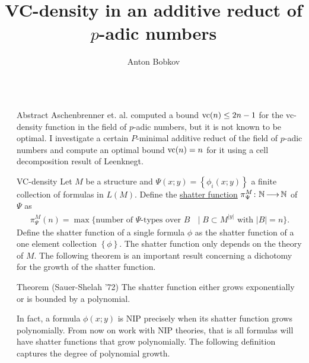\documentclass[final]{beamer}
\title{VC-density in an additive reduct of $p$-adic numbers}
\author{Anton Bobkov}
\institute{UCLA}
\newcommand{\curly}[1]{\left\{ #1 \right\}}
\newcommand{\defn}{\underline}
\newlength{\sepwid}
\newlength{\onecolwid}
\begin{document}

\setlength{\belowcaptionskip}{2ex} %
\setlength{\belowdisplayshortskip}{2ex} %

\begin{frame}[t] %

\begin{columns}[t] %

\begin{column}{\sepwid}\end{column} %

\begin{column}{\onecolwid} %

    \begin{block}{Abstract}
            Aschenbrenner et. al. computed a bound $\operatorname{vc}(n) \leq 2n - 1$ for the vc-density function in the field of $p$-adic numbers,
            but it is not known to be optimal.
            I investigate a certain $P$-minimal additive reduct of the field of $p$-adic numbers and
            compute an optimal bound $\operatorname{vc}(n) = n$ for it using a cell decomposition result of Leenknegt.
    \end{block}
    \begin{block}{VC-density}
	Let $M$ be a structure and $\Psi(x; y) = \curly{\phi_i(x; y)}$ a finite collection of formulas in $L(M)$.
        Define the \defn{shatter function} $\pi^M_\Psi \colon \mathbb{N} \operatorname{\longrightarrow} \mathbb{N}$ of $\Psi$ as
        \begin{align*}
            \pi^M_\Psi(n) = \max \{ \text {number of $\Psi$-types over $B$ }
            \mid B \subset M^{|y|} \text{ with } |B| = n\}.
        \end{align*}
        Define the shatter function of a single formula $\phi$ as the shatter function of a one element collection $\curly{\phi}$.
        The shatter function only depends on the theory of $M$.
        The following theorem is an important result concerning a dichotomy for the growth of the shatter function.
        \begin{alertblock}{Theorem (Sauer-Shelah '72)}
            The shatter function either grows exponentially or is bounded by a polynomial.
        \end{alertblock}
        In fact, a formula $\phi(x; y)$ is NIP precisely when its shatter function grows polynomially.
        From now on work with NIP theories, that is all formulas will have shatter functions that grow polynomially.
        The following definition captures the degree of polynomial growth.


\end{block}
\end{column}
\end{columns}
\end{frame}
\end{document}
